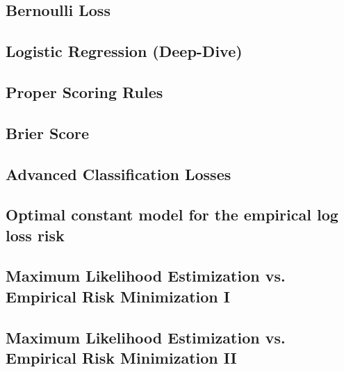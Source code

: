 \subsection{Bernoulli Loss}


\subsection{Logistic Regression (Deep-Dive)}


\subsection{Proper Scoring Rules}


\subsection{Brier Score}


\subsection{Advanced Classification Losses}


\subsection{Optimal constant model for the empirical log loss risk}


\subsection{Maximum Likelihood Estimization vs. Empirical Risk Minimization I}


\subsection{Maximum Likelihood Estimization vs. Empirical Risk Minimization II}


